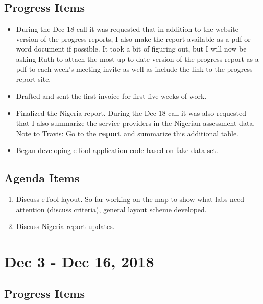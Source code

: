 \documentclass[]{article}
\providecommand{\tightlist}{%
  \setlength{\itemsep}{0pt}\setlength{\parskip}{0pt}}
\begin{document}
\hypertarget{progress-items-12}{%
\subsection{Progress Items}\label{progress-items-12}}

\begin{itemize}
\tightlist
\item
  During the Dec 18 call it was requested that in addition to the
  website version of the progress reports, I also make the report
  available as a pdf or word document if possible. It took a bit of
  figuring out, but I will now be asking Ruth to attach the most up to
  date version of the progress report as a pdf to each week's meeting
  invite as well as include the link to the progress report site.
\item
  Drafted and sent the first invoice for first five weeks of work.
\item
  Finalized the Nigeria report. During the Dec 18 call it was also
  requested that I also summarize the service providers in the Nigerian
  assessment data. Note to Travis: Go to the
  \textbf{\href{https://github.com/paceafenet/etool_dev/blob/master/existing_lab_data_exploration.md}{report}}
  and summarize this additional table.
\item
  Began developing eTool application code based on fake data set.
\end{itemize}

\hypertarget{agenda-items-12}{%
\subsection{Agenda Items}\label{agenda-items-12}}

\begin{enumerate}
\def\labelenumi{\arabic{enumi}.}
\tightlist
\item
  Discuss eTool layout. So far working on the map to show what labs need
  attention (discuss criteria), general layout scheme developed.
\item
  Discuss Nigeria report updates.
\end{enumerate}

\hypertarget{dec-3---dec-16-2018}{%
\section{Dec 3 - Dec 16, 2018}\label{dec-3---dec-16-2018}}

\hypertarget{progress-items-13}{%
\subsection{Progress Items}\label{progress-items-13}}
\end{document}
